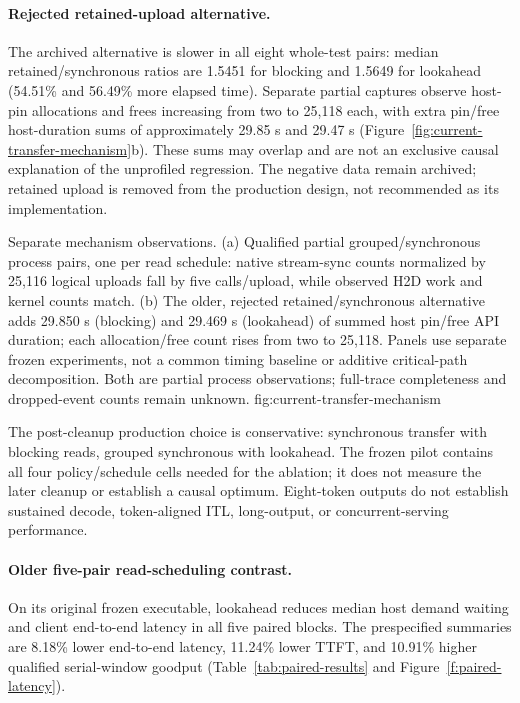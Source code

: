 \paragraph{Rejected retained-upload alternative.}
The archived alternative is slower in all eight whole-test pairs: median
retained/synchronous ratios are 1.5451 for blocking and 1.5649 for lookahead
(54.51\% and 56.49\% more elapsed time). Separate partial captures observe
host-pin allocations and frees increasing from two to 25,118 each, with
extra pin/free host-duration sums of approximately 29.85 s and 29.47 s
(Figure~\ref{fig:current-transfer-mechanism}b). These sums may overlap and
are not an exclusive causal explanation of the unprofiled regression.
The negative data remain archived; retained upload is removed from the
production design, not recommended as its implementation.

{Separate mechanism observations. (a) Qualified partial grouped/synchronous
process pairs, one per read schedule: native stream-sync counts normalized
by 25,116 logical uploads fall by five calls/upload, while observed H2D work
and kernel counts match. (b) The older, rejected retained/synchronous
alternative adds 29.850 s (blocking) and 29.469 s (lookahead) of summed host
pin/free API duration; each allocation/free count rises from two to 25,118.
Panels use separate frozen experiments, not a common timing baseline or
additive critical-path decomposition. Both are partial process observations;
full-trace completeness and dropped-event counts remain unknown.}
{fig:current-transfer-mechanism}

The post-cleanup production choice is conservative: synchronous transfer
with blocking reads, grouped synchronous with lookahead. The frozen pilot
contains all four policy/schedule cells needed for the ablation; it does
not measure the later cleanup or establish a causal optimum. Eight-token
outputs do not establish sustained decode, token-aligned ITL, long-output,
or concurrent-serving performance.

\paragraph{Older five-pair read-scheduling contrast.}
On its original frozen executable, lookahead reduces median host demand
waiting and client end-to-end latency
in all five paired blocks. The prespecified summaries are 8.18\% lower
end-to-end latency, 11.24\% lower TTFT, and 10.91\% higher qualified
serial-window goodput (Table~\ref{tab:paired-results} and
Figure~\ref{f:paired-latency}).

